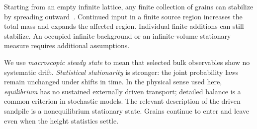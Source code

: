 Starting from an empty infinite lattice, any finite collection of grains can stabilize by spreading outward~\cite{levinepropp2010}. Continued input in a finite source region increases the total mass and expands the affected region. Individual finite additions can still stabilize. An occupied infinite background or an infinite-volume stationary measure requires additional assumptions.

We use \emph{macroscopic steady state} to mean that selected bulk observables show no systematic drift. \emph{Statistical stationarity} is stronger: the joint probability laws remain unchanged under shifts in time. In the physical sense used here, \emph{equilibrium} has no sustained externally driven transport; detailed balance is a common criterion in stochastic models. The relevant description of the driven sandpile is a nonequilibrium stationary state. Grains continue to enter and leave even when the height statistics settle.
